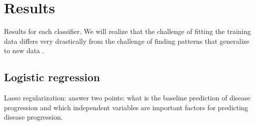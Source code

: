 \documentclass[12pt]{report}
\begin{document}
\section{Results}
Results for each classifier. We will realize that the challenge of fitting the training data differs very drastically from the challenge of finding patterns that generalize to new data \cite{goodfellow2016deep}.
\subsection{Logistic regression}

Lasso regularization: answer two points: what is the baseline prediction of disease progression and  which independent variables are important factors for predicting disease progression.
\end{document}
